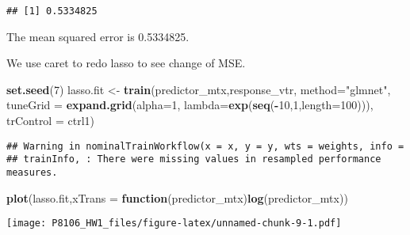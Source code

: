 \documentclass[]{article}
\newenvironment{Shaded}{\begin{snugshade}}{\end{snugshade}}
\newcommand{\ControlFlowTok}[1]{\textcolor[rgb]{0.13,0.29,0.53}{\textbf{#1}}}
\newcommand{\DataTypeTok}[1]{\textcolor[rgb]{0.13,0.29,0.53}{#1}}
\newcommand{\DecValTok}[1]{\textcolor[rgb]{0.00,0.00,0.81}{#1}}
\newcommand{\KeywordTok}[1]{\textcolor[rgb]{0.13,0.29,0.53}{\textbf{#1}}}
\newcommand{\NormalTok}[1]{#1}
\newcommand{\OperatorTok}[1]{\textcolor[rgb]{0.81,0.36,0.00}{\textbf{#1}}}
\newcommand{\StringTok}[1]{\textcolor[rgb]{0.31,0.60,0.02}{#1}}
\begin{document}
\begin{Shaded}
\end{Shaded}

\begin{verbatim}
## [1] 0.5334825
\end{verbatim}

The mean squared error is 0.5334825.

We use caret to redo lasso to see change of MSE.

\begin{Shaded}
\begin{Highlighting}[]
\KeywordTok{set.seed}\NormalTok{(}\DecValTok{7}\NormalTok{)}
\NormalTok{lasso.fit <-}\StringTok{ }\KeywordTok{train}\NormalTok{(predictor_mtx,response_vtr,}
                   \DataTypeTok{method=}\StringTok{"glmnet"}\NormalTok{,}
                   \DataTypeTok{tuneGrid =} \KeywordTok{expand.grid}\NormalTok{(}\DataTypeTok{alpha=}\DecValTok{1}\NormalTok{,}
                                          \DataTypeTok{lambda=}\KeywordTok{exp}\NormalTok{(}\KeywordTok{seq}\NormalTok{(}\OperatorTok{-}\DecValTok{10}\NormalTok{,}\DecValTok{1}\NormalTok{,}\DataTypeTok{length=}\DecValTok{100}\NormalTok{))),}
                   \DataTypeTok{trControl =}\NormalTok{ ctrl1)}
\end{Highlighting}
\end{Shaded}

\begin{verbatim}
## Warning in nominalTrainWorkflow(x = x, y = y, wts = weights, info =
## trainInfo, : There were missing values in resampled performance measures.
\end{verbatim}

\begin{Shaded}
\begin{Highlighting}[]
\KeywordTok{plot}\NormalTok{(lasso.fit,}\DataTypeTok{xTrans =} \ControlFlowTok{function}\NormalTok{(predictor_mtx)}\KeywordTok{log}\NormalTok{(predictor_mtx))}
\end{Highlighting}
\end{Shaded}

\texttt{[image: P8106\_HW1\_files/figure-latex/unnamed-chunk-9-1.pdf]}
\end{document}
